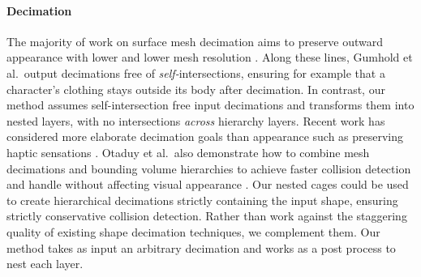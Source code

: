 
\paragraph{Decimation}
%
The majority of work on surface mesh decimation aims to preserve outward
appearance with lower and lower mesh resolution
\cite{Hoppe:1996:PM,Garland:1997:SSU,Melax98}.
%
Along these lines, Gumhold et al.\ output decimations free of
\emph{self-}intersections, ensuring for example that a character's clothing
stays outside its body after decimation.
%
In contrast, our method assumes self-intersection free input decimations and
transforms them into nested layers, with no intersections \emph{across}
hierarchy layers.
%
Recent work has considered more elaborate decimation goals than appearance such
as preserving haptic sensations \cite{Otaduy:2003:SPS}.
%
Otaduy et al.\ also demonstrate how to combine mesh decimations and bounding
volume hierarchies to achieve faster collision detection and handle without
affecting visual appearance .
%
Our nested cages could be used to create hierarchical decimations strictly
containing the input shape, ensuring strictly conservative collision detection.
%
Rather than work against the staggering quality of existing shape decimation
techniques, we complement them. Our method takes as input an arbitrary
decimation and works as a post process to nest each layer.







